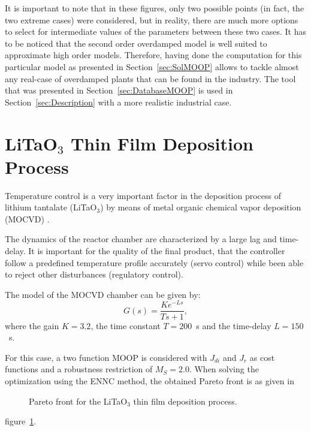 It is important to note that in these figures, only two possible points (in fact, the two extreme cases) were considered, but in reality, there are much more options to select for intermediate values of the parameters between these two cases. It has to be noticed that the second order overdamped model is well suited to approximate high order models. Therefore, having done the computation for this particular model as presented in Section~\ref{sec:SolMOOP} allows to tackle almost any real-case of overdamped plants that can be found in the industry. The tool that was presented in Section~\ref{sec:DatabaseMOOP} is used in Section~\ref{sec:Description} with a more realistic industrial case.
\section{LiTaO$_3$ Thin Film Deposition Process}
\label{sec:LiTAO3}
Temperature control is a very important factor in the deposition process of lithium tantalate (LiTaO$_3$) by means of metal organic chemical vapor deposition (MOCVD) \cite{Zhang2004}.

The dynamics of the reactor chamber are characterized by a large lag and time-delay. It is important for the quality of the final product, that the controller follow a predefined temperature profile accurately (servo control) while been able to reject other disturbances (regulatory control).

The model of the MOCVD chamber can be given by:
\begin{equation}
G(s) = \frac{K e^{-L s}}{T s+1},
\label{eq:GsLita}
\end{equation}
%
where the gain $K = 3.2$, the time constant $T = 200$~s and the time-delay $L = 150$~s.

For this case, a two function MOOP is considered with $J_{di}$ and $J_{r}$ as cost functions and a robustness restriction of $M_S = 2.0$. When solving the optimization using the ENNC method, the obtained Pareto front is as given in %
\begin{figure}[tb]
	\centering
	\caption{Pareto front for the LiTaO$_3$ thin film deposition process.}
	\label{fig:LitaPareto}
\end{figure}
%
figure~\ref{fig:LitaPareto}.

